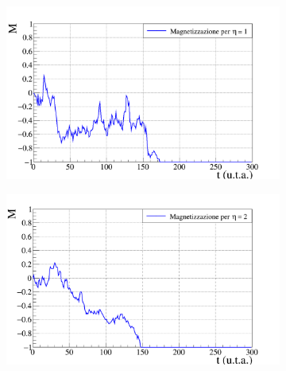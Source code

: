 \documentclass[letterpaper,10pt]{article}
\begin{document}
\begin{figure}[h]
\centering
\begin{subfigure}{0.95\textwidth}
\includegraphics[width=\linewidth]{partial_magn_graph_v1.png}
\end{subfigure}
\begin{subfigure}{0.95\textwidth}
\includegraphics[width=\linewidth]{partial_magn_graph_v2.png}
\end{subfigure}
\end{figure}
\end{document}
